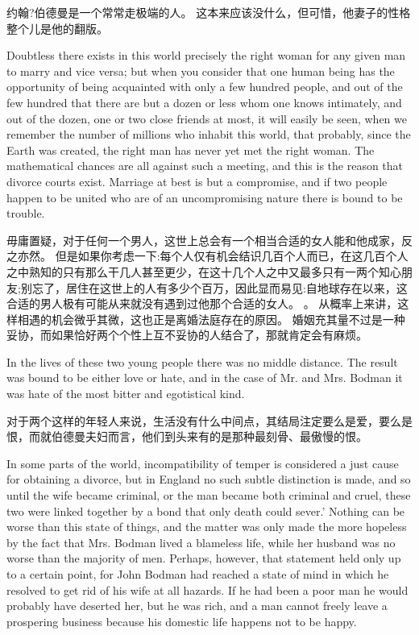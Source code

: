 \documentclass[cs4size, a4paper, 12pt]{article}
\newcounter{numpar}
\newcommand*{\newpar}{\numpar{}}
\begin{document}
	约翰?伯德曼是一个常常走极端的人。 这本来应该没什么，但可惜，他妻子的性格整个儿是他的翻版。 
	
	\newpar Doubtless there exists in this world precisely the right woman for any given man to marry and vice versa; but when you consider that one human being has the opportunity of being acquainted with only a few hundred people, and out of the few hundred that there are but a dozen or less whom one knows intimately, and out of the dozen, one or two close friends at most, it will easily be seen, when we remember the number of millions who inhabit this world, that probably, since the Earth was created, the right man has never yet met the right woman. The mathematical chances are all against such a meeting, and this is the reason that divorce courts exist. Marriage at best is but a compromise, and if two people happen to be united who are of an uncompromising nature there is bound to be trouble.
	
	毋庸置疑，对于任何一个男人，这世上总会有一个相当合适的女人能和他成家，反之亦然。 但是如果你考虑一下:每个人仅有机会结识几百个人而已，在这几百个人之中熟知的只有那么干几人甚至更少，在这十几个人之中又最多只有一两个知心朋友;别忘了，居住在这世上的人有多少个百万，因此显而易见:自地球存在以来，这合适的男人极有可能从来就没有遇到过他那个合适的女人。 。 从概率上来讲，这样相遇的机会微乎其微，这也正是离婚法庭存在的原因。 婚姻充其量不过是一种妥协，而如果恰好两个个性上互不妥协的人结合了，那就肯定会有麻烦。 
	
	\newpar In the lives of these two young people there was no middle distance. The result was bound to be either love or hate, and in the case of Mr. and Mrs. Bodman it was hate of the most bitter and egotistical kind.
	
	对于两个这样的年轻人来说，生活没有什么中间点，其结局注定要么是爱，要么是恨，而就伯德曼夫妇而言，他们到头来有的是那种最刻骨、最傲慢的恨。 
	
	\newpar In some parts of the world, incompatibility of temper is considered a just cause for obtaining a divorce, but in England no such subtle distinction is made, and so until the wife became criminal, or the man became both criminal and cruel, these two were linked together by a bond that only death could sever.' Nothing can be worse than this state of things, and the matter was only made the more hopeless by the fact that Mrs. Bodman lived a blameless life, while her husband was no worse than the majority of men. Perhaps, however, that statement held only up to a certain point, for John Bodman had reached a state of mind in which he resolved to get rid of his wife at all hazards. If he had been a poor man he would probably have deserted her, but he was rich, and a man cannot freely leave a prospering business because his domestic life happens not to be happy.
	
\end{document}

